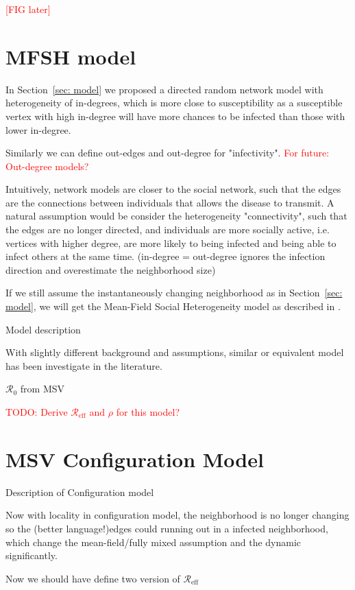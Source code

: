 \documentclass[12pt]{article}
\theoremstyle{plain}
\theoremstyle{definition}
\begin{document}
\textcolor{red}{[FIG later]}

\section{MFSH model}
\label{sec: MFSH}

In Section~\ref{sec: model} we proposed a directed random network model with heterogeneity of in-degrees, which is more close to susceptibility as a susceptible vertex with high in-degree will have more chances to be infected than those with lower in-degree.

Similarly we can define out-edges and out-degree for "infectivity". 
\textcolor{red}{For future: Out-degree models?}

Intuitively, network models are closer to the social network, such that the edges are the connections between individuals that allows the disease to transmit.
A natural assumption would be consider the heterogeneity "connectivity", such that the edges are no longer directed, and individuals are more socially active, i.e. vertices with higher degree, are more likely to being infected and being able to infect others at the same time.
(in-degree = out-degree ignores the infection direction and overestimate the neighborhood size)

If we still assume the instantaneously changing neighborhood as in Section~\ref{sec: model}, we will get the Mean-Field Social Heterogeneity model as described in \cite{MillerSlimVolz:2012}.

Model description

With slightly different background and assumptions, similar or equivalent model has been investigate in the literature.

$\mathcal{R}_0$ from MSV

\textcolor{red}{TODO: Derive $\mathcal{R}_\text{eff}$ and $\rho$ for this model?}

\section{MSV Configuration Model}
\label{sec: Config}

Description of Configuration model

Now with locality in configuration model, the neighborhood is no longer changing so the (better language!)edges could running out in a infected neighborhood, which change the mean-field/fully mixed assumption and the dynamic significantly.

Now we should have define two version of 
$\mathcal{R}_\text{eff}$
\end{document}
